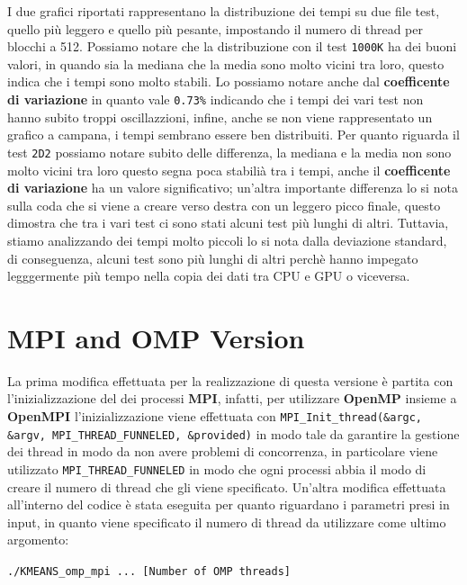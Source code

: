 \documentclass{article}
\begin{document}
  I due grafici riportati rappresentano la distribuzione dei tempi su due file test, quello più leggero e quello più pesante, impostando il numero di thread per blocchi a 
  512. Possiamo notare che la distribuzione con il test \verb|1000K| ha dei buoni valori, in quando sia la mediana che la media sono molto vicini tra loro, questo indica che 
  i tempi sono molto stabili. Lo possiamo notare anche dal \textbf{coefficente di variazione} in quanto vale \verb|0.73%| indicando che i tempi dei vari test non hanno subito 
  troppi oscillazzioni, infine, anche se non viene rappresentato un grafico a campana, i tempi sembrano essere ben distribuiti. 
  Per quanto riguarda il test \verb|2D2| possiamo notare subito delle differenza, la mediana e la media non sono molto vicini tra loro questo segna poca stabilià tra i tempi, anche 
  il \textbf{coefficente di variazione} ha un valore significativo; un'altra importante differenza lo si nota sulla coda che si viene a creare verso destra con un leggero picco 
  finale, questo dimostra che tra i vari test ci sono stati alcuni test più lunghi di altri. Tuttavia, stiamo analizzando dei tempi molto piccoli lo si nota dalla deviazione standard, 
  di conseguenza, alcuni test sono più lunghi di altri perchè hanno impegato legggermente più tempo nella copia dei dati tra CPU e GPU o viceversa.

  \section{MPI and OMP Version}

  La prima modifica effettuata per la realizzazione di questa versione è partita con l'inizializzazione del dei processi \textbf{MPI}, infatti, per utilizzare \textbf{OpenMP} insieme a \textbf{OpenMPI} l'inizializzazione viene effettuata con 
  \verb|MPI_Init_thread(&argc, &argv, MPI_THREAD_FUNNELED, &provided)| in modo tale da  garantire la gestione dei thread in modo da non avere problemi di concorrenza, in particolare viene utilizzato \verb|MPI_THREAD_FUNNELED| in modo che ogni processi 
  abbia il modo di creare il numero di thread che gli viene specificato.
  Un'altra modifica effettuata all'interno del codice è stata eseguita per quanto riguardano i parametri presi in input, in quanto viene specificato il numero di thread da utilizzare come ultimo argomento:
  \begin{center}
    \verb|./KMEANS_omp_mpi ... [Number of OMP threads]|
  \end{center}
\end{document}

